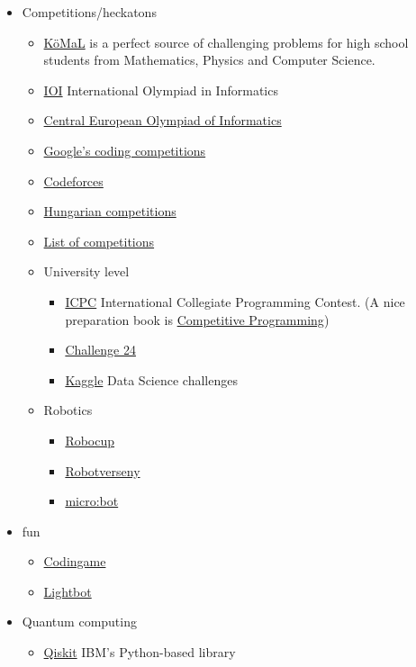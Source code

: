 \documentclass{article}
\begin{document}
\begin{itemize}
    
    \item Competitions/heckatons
    \begin{itemize}
        \item \href{https://www.komal.hu/home.e.shtml}{KöMaL} is a perfect source of challenging problems for high school students from Mathematics, Physics and Computer Science.
        \item \href{https://ioinformatics.org/}{IOI} International Olympiad in Informatics
        \item \href{http://ceoi.inf.elte.hu/}{Central European Olympiad of Informatics}
        \item \href{https://codingcompetitions.withgoogle.com/}{Google's coding competitions}
        \item \href{https://codeforces.com/}{Codeforces}
        \item \href{http://informatika.fazekas.hu/informatika-versenyek-201920/}{Hungarian competitions}
        \item \href{https://www.mycplus.com/featured-articles/programming-contests-and-challenges/}{List of competitions}
        \item University level
        \begin{itemize}
            \item \href{https://icpc.baylor.edu/}{ICPC} International Collegiate Programming Contest. (A nice preparation book is \href{https://www.goodreads.com/book/show/22820951-competitive-programming}{Competitive Programming})
            \item \href{http://www.challenge24.org/}{Challenge 24}
            \item \href{https://www.kaggle.com/}{Kaggle} Data Science challenges
        \end{itemize}
        \item Robotics
        \begin{itemize}
            \item \href{https://www.robocup.org/}{Robocup}
            \item \href{https://robotprog.hu/}{Robotverseny}
            \item \href{https://www.microbot.hu/}{micro:bot}
        \end{itemize}
    \end{itemize}
    
   \item fun
   \begin{itemize}
        \item \href{https://www.codingame.com/}{Codingame}
        \item \href{https://lightbot.com/}{Lightbot}
   \end{itemize}
   \item Quantum computing
   \begin{itemize}
       \item \href{https://qiskit.org/}{Qiskit} IBM’s Python-based library
   \end{itemize}


\end{itemize}
\end{document}

